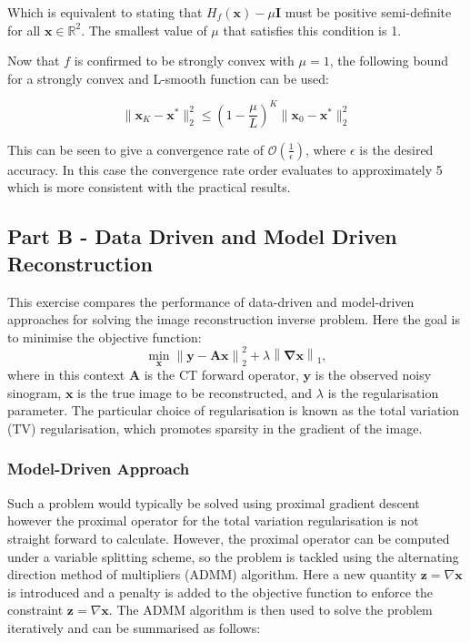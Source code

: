 \documentclass[11pt]{article}
\begin{document}
Which is equivalent to stating that \( H_f(\mathbf{x}) - \mu \mathbf{I} \) must be positive semi-definite for all \( \mathbf{x} \in \mathbb{R}^2 \). The smallest value of \( \mu \) that satisfies this condition is 1.

Now that \( f \) is confirmed to be strongly convex with \( \mu = 1 \), the following bound for a strongly convex and L-smooth function can be used:

\[
\|\mathbf{x}_K - \mathbf{x}^*\|_2^2 \leq \left(1 - \frac{\mu}{L}\right)^K \|\mathbf{x}_0 - \mathbf{x}^*\|_2^2
\]

This can be seen to give a convergence rate of $\mathcal{O}\left(\frac{1}{\epsilon}\right)$, where $\epsilon$ is the desired accuracy. In this case the convergence rate order evaluates to approximately 5 which is more consistent with the practical results.

\subsection{Part B - Data Driven and Model Driven Reconstruction}
This exercise compares the performance of data-driven and model-driven approaches for solving the image reconstruction inverse problem. Here the goal is to minimise the objective function:
\[
\min_{\mathbf{x}} \left\| \mathbf{y} - \mathbf{A} \mathbf{x} \right\|_2^2 + \lambda \left\| \mathbf \nabla \mathbf{x} \right\|_1,
\]
where in this context \( \mathbf{A} \) is the CT forward operator, \( \mathbf{y} \) is the observed noisy sinogram, \( \mathbf{x} \) is the true image to be reconstructed, and \( \lambda \) is the regularisation parameter. The particular choice of regularisation is known as the total variation (TV) regularisation, which promotes sparsity in the gradient of the image. 
\subsubsection{Model-Driven Approach}
Such a problem would typically be solved using proximal gradient descent however the proximal operator for the total variation regularisation is not straight forward to calculate. However, the proximal operator can be computed under a variable splitting scheme, so the problem is tackled using the alternating direction method of multipliers (ADMM) algorithm. Here a new quantity \( \mathbf{z} = \nabla \mathbf{x}\) is introduced and a penalty is added to the objective function to enforce the constraint \( \mathbf{z} = \nabla \mathbf{x} \). The ADMM algorithm is then used to solve the problem iteratively and can be summarised as follows:
\end{document}
